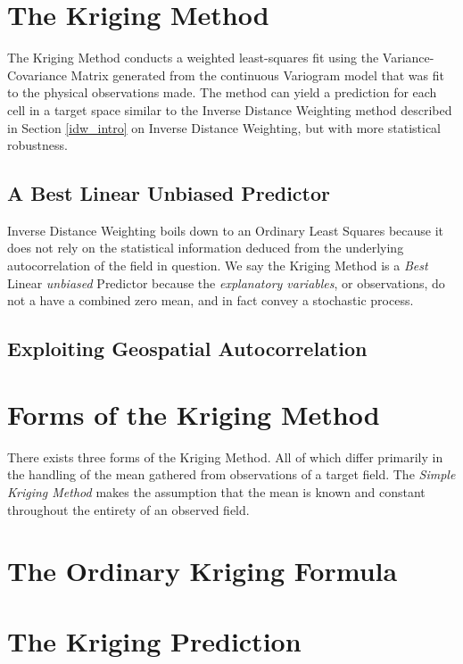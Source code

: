 \documentclass[11pt]{ucthesis}
\begin{document}
\section{The Kriging Method}
The Kriging Method conducts a weighted least-squares fit using the Variance-Covariance Matrix generated from the continuous Variogram model that was fit to the physical observations made. The method can yield a prediction for each cell in a target space similar to the Inverse Distance Weighting method described in Section \ref{idw_intro} on Inverse Distance Weighting, but with more statistical robustness.
\subsection{A Best Linear Unbiased Predictor}
Inverse Distance Weighting boils down to an Ordinary Least Squares because it does not rely on the statistical information deduced from the underlying autocorrelation of the field in question. We say the Kriging Method is a \textit{Best} Linear \textit{unbiased} Predictor because the \textit{explanatory variables}, or observations, do not a have a combined zero mean, and in fact convey a stochastic process.
\subsection{Exploiting Geospatial Autocorrelation}
\section{Forms of the Kriging Method}
There exists three forms of the Kriging Method. All of which differ primarily in the handling of the mean gathered from observations of a target field. The \textit{Simple Kriging Method} makes the assumption that the mean is known and constant throughout the entirety of an observed field. \cite{vandergraad:nnkrig}
\section{The Ordinary Kriging Formula}
\section{The Kriging Prediction}
\end{document}
